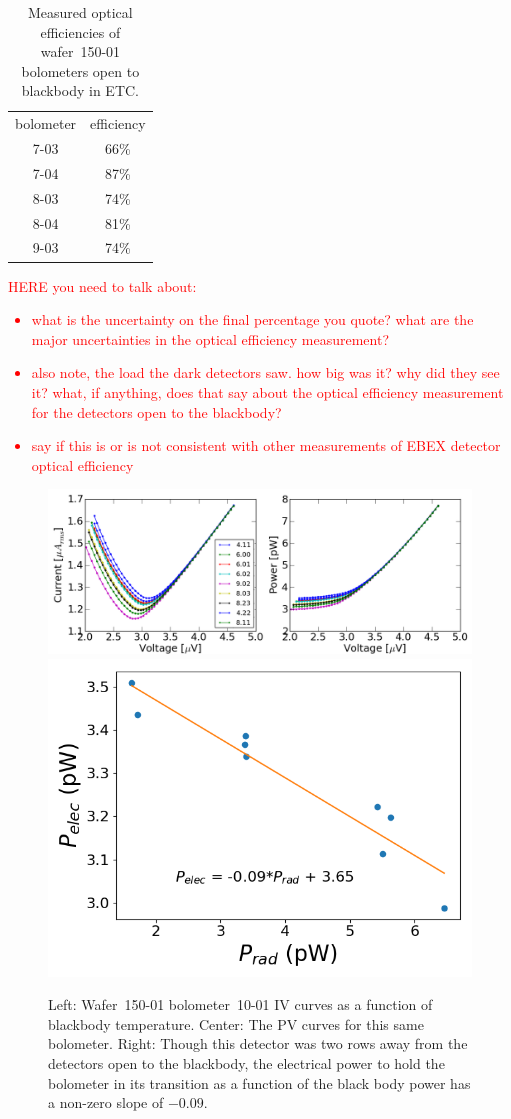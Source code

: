 \begin{table}[htp]
\begin{center}
\begin{tabular}{|c|c|}
bolometer & efficiency \\
7-03	& 66\% \\
7-04	& 87\% \\
8-03	& 74\% \\
8-04	& 81\% \\
9-03	& 74\% \\
\end{tabular}
\end{center}
\caption{Measured optical efficiencies of wafer~150-01 bolometers open to blackbody in \ac{ETC}.
\label{tab:opt_eff} }
\end{table}


\textcolor{red}{HERE you need to talk about:
\begin{itemize}
\item what is the uncertainty on the final percentage you quote? what are the major uncertainties in the optical efficiency measurement?
\item also note, the load the dark detectors saw. how big was it? why did they see it? what, if anything, does that say about the optical efficiency measurement for the detectors open to the blackbody? 
\item say if this is or is not consistent with other measurements of EBEX detector optical efficiency
\end{itemize}
 }


\begin{figure}[htp]
\begin{center}
\includegraphics[width=0.65\columnwidth]{figures/SqCh7_Ch5_all_bb_curves.png}
\includegraphics[width=0.33\columnwidth]{figures/SqCh7_Ch5_p_vs_p.png}
\caption{Left: Wafer~150-01 bolometer~10-01 IV curves as a function of blackbody temperature. Center: The PV curves for this same bolometer. Right: Though this detector was two rows away from the detectors open to the blackbody, the electrical power to hold the bolometer in its transition as a function of the black body power has a non-zero slope of $-0.09$. 
\label{fig:dark_pelec_vs_popt} }
\end{center}
\end{figure}


